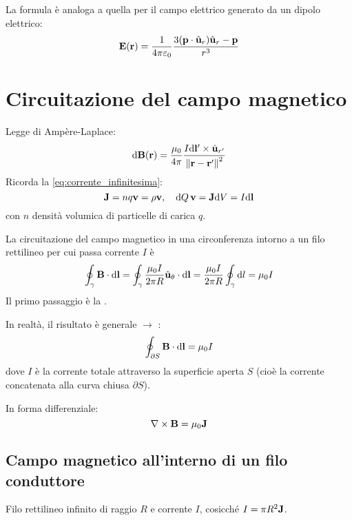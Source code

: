 La formula è analoga a quella per il campo elettrico generato da un dipolo elettrico:
\begin{equation}
    \mathbf{E}(\mathbf{r}) = \frac{1}{4\pi\varepsilon_0} \frac{3 (\mathbf{p} \cdot \hat{\mathbf{u}}_{r}) \hat{\mathbf{u}}_{r} - \mathbf{p}}{r^3}
\end{equation}



\section{Circuitazione del campo magnetico}

Legge di Ampère-Laplace:
\begin{equation}
    \mathrm{d} \mathbf{B}(\mathbf{r}) = \frac{\mu_0}{4\pi} \frac{I \mathrm{d} \mathbf{l}' \times \hat{\mathbf{u}}_{r'}}{\left\lVert \mathbf{r} - \mathbf{r}' \right\rVert^2}
\end{equation}
Ricorda la \eqref{eq:corrente_infinitesima}:
\begin{equation}
    \mathbf{J} = n q \mathbf{v} = \rho \mathbf{v}, \quad \mathrm{d} Q \, \mathbf{v} = \mathbf{J} \mathrm{d} V = I \mathrm{d}\mathbf{l}
\end{equation}
con $n$ densità volumica di particelle di carica $q$.

La circuitazione del campo magnetico in una circonferenza intorno a un filo rettilineo per cui passa corrente $I$ è
\begin{equation}
    \oint_\gamma \mathbf{B} \cdot \mathrm{d} \mathbf{l} = \oint_\gamma \frac{\mu_0 I}{2\pi R} \hat{\mathbf{u}}_{\theta} \cdot \mathrm{d} \mathbf{l} = \frac{\mu_0 I}{2\pi R} \oint_\gamma \mathrm{d} l = \mu_0 I
\end{equation}
Il primo passaggio è la .

In realtà, il risultato è generale $\to$ :
\begin{equation}
    \oint_{\partial S} \mathbf{B} \cdot \mathrm{d} \mathbf{l} = \mu_0 I
\end{equation}
dove $I$ è la corrente totale attraverso la superficie aperta $S$ (cioè la corrente concatenata alla curva chiusa $\partial S$).

In forma differenziale:
\begin{equation}
    \nabla \times \mathbf{B} = \mu_0 \mathbf{J}
\end{equation}

\subsection{Campo magnetico all'interno di un filo conduttore}

Filo rettilineo infinito di raggio $R$ e corrente $I$, cosicché $I = \pi R^2\mathbf{J}$.

